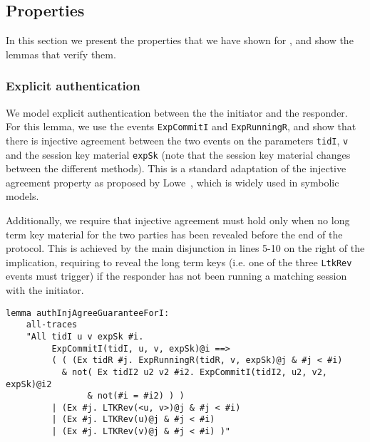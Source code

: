 

\subsection{Properties}
\label{sec:properties}

In this section we present the properties that we have shown for
\mEdhoc, and show the lemmas that verify them.

\subsubsection{Explicit authentication}

We model explicit authentication between the the initiator and the
responder.
%
For this lemma, we use the events \lstinline{ExpCommitI} and
\lstinline{ExpRunningR}, and show that there is injective agreement
between the two events on the parameters \lstinline{tidI},
\lstinline{v} and the session key material \lstinline{expSk} (note
that the session key material changes between the different \mEdhoc
methods).
%
This is a standard adaptation of the injective agreement property as
proposed by Lowe~\cite{lowes-paper}, which is widely used in symbolic
models. 

Additionally, we require that injective agreement must hold only when
no long term key material for the two parties has been revealed before
the end of the protocol.
%
This is achieved by the main disjunction in lines 5-10 on the right of
the implication, requiring to reveal the long term keys (i.e. one of
the three \lstinline{LtkRev} events must trigger) if the responder has
not been running a matching session with the initiator.

\begin{lstlisting}
lemma authInjAgreeGuaranteeForI:
    all-traces
    "All tidI u v expSk #i.
         ExpCommitI(tidI, u, v, expSk)@i ==>
         ( ( (Ex tidR #j. ExpRunningR(tidR, v, expSk)@j & #j < #i)
           & not( Ex tidI2 u2 v2 #i2. ExpCommitI(tidI2, u2, v2, expSk)@i2
                & not(#i = #i2) ) )
         | (Ex #j. LTKRev(<u, v>)@j & #j < #i)
         | (Ex #j. LTKRev(u)@j & #j < #i)
         | (Ex #j. LTKRev(v)@j & #j < #i) )"
\end{lstlisting}

